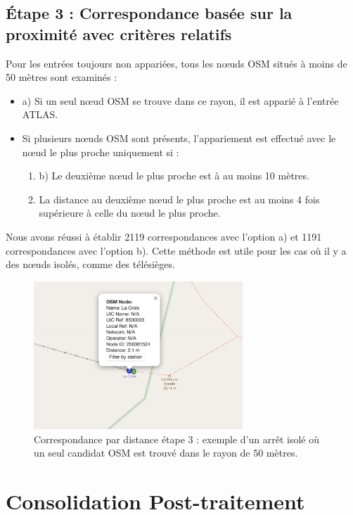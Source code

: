 \subsection{Étape 3 : Correspondance basée sur la proximité avec critères relatifs}  
Pour les entrées toujours non appariées, tous les nœuds OSM situés à moins de 50 mètres sont examinés :  
\begin{itemize}  
    \item a) Si un seul nœud OSM se trouve dans ce rayon, il est apparié à l’entrée ATLAS.  
    \item Si plusieurs nœuds OSM sont présents, l’appariement est effectué avec le nœud le plus proche uniquement si :  
    \begin{enumerate}  
        \item b) Le deuxième nœud le plus proche est à au moins 10 mètres.  
        \item La distance au deuxième nœud le plus proche est au moins 4 fois supérieure à celle du nœud le plus proche.  
    \end{enumerate}  
\end{itemize}  
Nous avons réussi à établir 2119 correspondances avec l'option a) et 1191 correspondances avec l'option b).  
Cette méthode est utile pour les cas où il y a des nœuds isolés, comme des télésièges.  

\begin{figure}[h] 
    \centering
    \includegraphics[width=0.7\textwidth]{../figures/correspondances/distance_3.png}
    \caption[Correspondance par distance – étape 3]{Correspondance par distance étape 3 : exemple d'un arrêt isolé où un seul candidat OSM est trouvé dans le rayon de 50 mètres.}
    \label{fig:distance_stage3}
\end{figure} 

\section{Consolidation Post-traitement}

